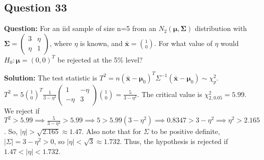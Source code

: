 \subsection*{Question 33}
\textbf{Question:} For an iid sample of size n=5 from an $N_2(\boldsymbol{\mu}, \boldsymbol{\Sigma})$ distribution with $\boldsymbol{\Sigma} = \begin{pmatrix} 3 & \eta \\ \eta & 1 \end{pmatrix}$, where $\eta$ is known, and $\bar{\mathbf{x}}=\binom{1}{0}$. For what value of $\eta$ would $H_0: \boldsymbol{\mu} = (0,0)^T$ be rejected at the 5\% level?

\textbf{Solution:}
The test statistic is $T^2 = n(\bar{\mathbf{x}}-\boldsymbol{\mu}_0)^T \Sigma^{-1} (\bar{\mathbf{x}}-\boldsymbol{\mu}_0) \sim \chi^2_p$.
$T^2 = 5 \binom{1}{0}^T \frac{1}{3-\eta^2}\begin{pmatrix} 1 & -\eta \\ -\eta & 3 \end{pmatrix} \binom{1}{0} = \frac{5}{3-\eta^2}$.
The critical value is $\chi^2_{2, 0.05} = 5.99$.
We reject if $T^2 > 5.99 \implies \frac{5}{3-\eta^2} > 5.99 \implies 5 > 5.99(3-\eta^2) \implies 0.8347 > 3-\eta^2 \implies \eta^2 > 2.165$.
So, $|\eta| > \sqrt{2.165} \approx 1.47$. Also note that for $\Sigma$ to be positive definite, $|\Sigma|=3-\eta^2 > 0$, so $|\eta|<\sqrt{3}\approx 1.732$.
Thus, the hypothesis is rejected if $1.47 < |\eta| < 1.732$.

